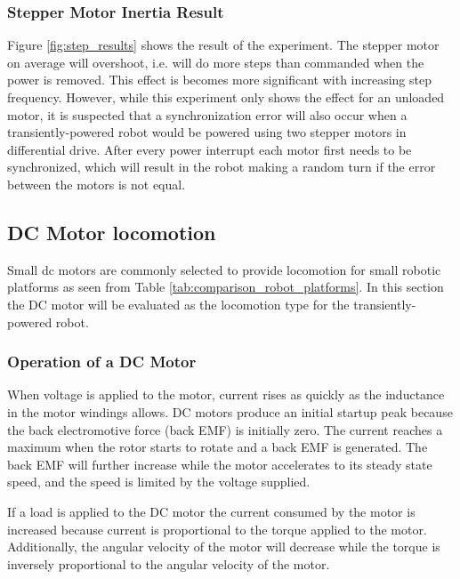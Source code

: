 

\subsubsection{Stepper Motor Inertia Result}

Figure \ref{fig:step_results} shows the result of the experiment.
The stepper motor on average will overshoot, i.e. will do more steps than commanded when the power is removed.
This effect is becomes more significant with increasing step frequency.
However, while this experiment only shows the effect for an unloaded motor, it is suspected that a synchronization error will also occur when a transiently-powered robot would be powered using two stepper motors in differential drive.
After every power interrupt each motor first needs to be synchronized, which will result in the robot making a random turn if the error between the motors is not equal.

\subsection{DC Motor locomotion}
\label{sec:pre_dc_motor_locomotion}
Small dc motors are commonly selected to provide locomotion for small robotic platforms as seen from Table \ref{tab:comparison_robot_platforms}.
In this section the DC motor will be evaluated as the locomotion type for the transiently-powered robot.

\subsubsection{Operation of a DC Motor}

When voltage is applied to the motor, current rises as quickly as the inductance in the motor windings allows.
DC motors produce an initial startup peak because the back electromotive force (back EMF) is initially zero.
The current reaches a maximum when the rotor starts to rotate and a back EMF is generated.
The back EMF will further increase while the motor accelerates to its steady state speed, and the speed is limited by the voltage supplied.

If a load is applied to the DC motor the current consumed by the motor is increased because current is proportional to the torque applied to the motor.
Additionally, the angular velocity of the motor will decrease while the torque is inversely proportional to the angular velocity of the motor.

